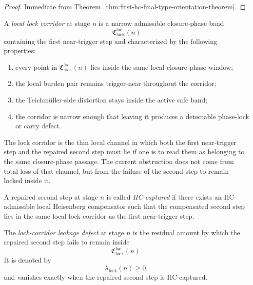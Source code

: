 \begin{proof}
Immediate from Theorem~\ref{thm:first-hc-final-type-orientation-theorem}.
\end{proof}


\begin{definition}
\label{def:local-lock-corridor}
A \emph{local lock corridor} at stage $n$ is a narrow admissible closure-phase band
\[
 \mathfrak C_{\mathrm{lock}}^{\mathrm{loc}}(n)
\]
containing the first near-trigger step and characterized by the following properties:
\begin{enumerate}[leftmargin=2em,label=(\alph*)]
 \item every point in $\mathfrak C_{\mathrm{lock}}^{\mathrm{loc}}(n)$ lies inside the same local closure-phase window;
 \item the local burden pair remains trigger-near throughout the corridor;
 \item the Teichm\"uller-side distortion stays inside the active safe band;
 \item the corridor is narrow enough that leaving it produces a detectable phase-lock or carry defect.
\end{enumerate}
\end{definition}

\begin{remark}
\label{rem:geometric-meaning-of-the-lock-corridor}
The lock corridor is the thin local channel in which both the first near-trigger step and the repaired second step must lie if one is to read them as belonging to the same closure-phase passage. The current obstruction does not come from total loss of that channel, but from the failure of the second step to remain locked inside it.
\end{remark}

\begin{definition}
\label{def:hc-captured-repaired-second-step}
A repaired second step at stage $n$ is called \emph{HC-captured} if there exists an HC-admissible local Heisenberg compensator such that the compensated second step lies in the same local lock corridor as the first near-trigger step.
\end{definition}

\begin{definition}
\label{def:lock-corridor-leakage-defect}
The \emph{lock-corridor leakage defect} at stage $n$ is the residual amount by which the repaired second step fails to remain inside
\[
 \mathfrak C_{\mathrm{lock}}^{\mathrm{loc}}(n).
\]
It is denoted by
\[
 \lambda_{\mathrm{lock}}(n)\ge 0,
\]
and vanishes exactly when the repaired second step is HC-captured.
\end{definition}

